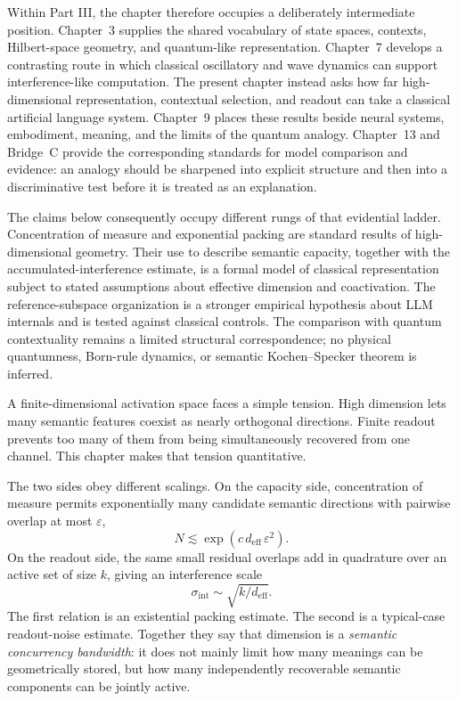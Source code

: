 \documentclass[
  aps,
  reprint,
  superscriptaddress,
  floatfix,
  nofootinbib,
  longbibliography
]{revtex4-2}
\newcommand{\deff}{d_{\mathrm{eff}}}
\newcommand{\sint}{\sigma_{\mathrm{int}}}
\begin{document}
Within Part III, the chapter therefore occupies a deliberately intermediate
position.  Chapter~3 supplies the shared vocabulary of state spaces,
contexts, Hilbert-space geometry, and quantum-like representation.
Chapter~7 develops a contrasting route in which classical oscillatory and
wave dynamics can support interference-like computation.  The present
chapter instead asks how far high-dimensional representation, contextual
selection, and readout can take a classical artificial language system.
Chapter~9 places these results beside neural systems, embodiment, meaning,
and the limits of the quantum analogy.  Chapter~13 and Bridge~C provide the
corresponding standards for model comparison and evidence: an analogy should
be sharpened into explicit structure and then into a discriminative test
before it is treated as an explanation.

The claims below consequently occupy different rungs of that evidential
ladder.  Concentration of measure and exponential packing are standard
results of high-dimensional geometry.  Their use to describe semantic
capacity, together with the accumulated-interference estimate, is a formal
model of classical representation subject to stated assumptions about
effective dimension and coactivation.  The reference-subspace organization is
a stronger empirical hypothesis about LLM internals and is tested against
classical controls.  The comparison with quantum contextuality remains a
limited structural correspondence; no physical quantumness, Born-rule
dynamics, or semantic Kochen--Specker theorem is inferred.

A finite-dimensional activation space faces a simple tension. High
dimension lets many semantic features coexist as nearly orthogonal
directions. Finite readout prevents too many of them from being
simultaneously recovered from one channel. This chapter makes that
tension quantitative.

The two sides obey different scalings. On the capacity side,
concentration of measure permits exponentially many candidate semantic
directions with pairwise overlap at most $\varepsilon$,
%
\begin{equation}
\label{eq:intro-capacity}
N\lesssim \exp(c\,\deff\,\varepsilon^{2}).
\end{equation}
%
On the readout side, the same small residual overlaps add in quadrature
over an active set of size $k$, giving an interference scale
%
\begin{equation}
\label{eq:intro-readout}
\sint\sim\sqrt{k/\deff}.
\end{equation}
%
The first relation is an existential packing estimate. The second is a
typical-case readout-noise estimate. Together they say that dimension
is a \emph{semantic concurrency bandwidth}: it does not mainly limit how
many meanings can be geometrically stored, but how many independently
recoverable semantic components can be jointly active.
\end{document}
